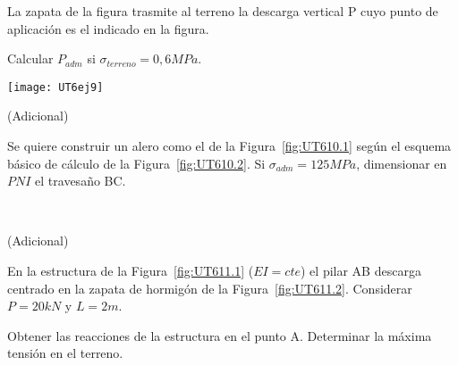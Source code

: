 \ejercicio 

La zapata de la figura trasmite al terreno la descarga vertical P cuyo punto de aplicación es el indicado en la figura.

Calcular $P_{adm}$ si $\sigma_{terreno}=0,6MPa$.

\begin{center}
\texttt{[image: UT6ej9]}
\end{center}

\ejercicio (Adicional)

Se quiere construir un alero como el de la Figura~\ref{fig:UT610.1} según el esquema básico de cálculo de la Figura~\ref{fig:UT610.2}. Si $\sigma_{adm}=125MPa$, dimensionar en $PNI$ el travesaño BC.

\begin{figure}[htb]
	\centering
\subfloat[Alero]{
\texttt{[image: UT6ej10-1]}
	\label{fig:UT610.1}}
~
\caption{}
	\label{fig:UT610}
\end{figure}

\ejercicio (Adicional)

En la estructura de la Figura~\ref{fig:UT611.1} ($EI=cte$) el pilar AB descarga centrado en la zapata de hormigón de la Figura~\ref{fig:UT611.2}. Considerar $P=20kN$ y $L=2m$.

\begin{figure}[htb]
	\centering
{}
\hspace{0.1\textwidth}
\subfloat[Zapata]{
\texttt{[image: UT6ej11-2]}
	\label{fig:UT611.2}}
\caption{}
	\label{fig:UT611}
\end{figure}

\parte Obtener las reacciones de la estructura en el punto A.
\parte Determinar la máxima tensión en el terreno.
